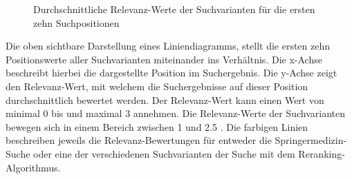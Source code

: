 
\begin{figure}[H]
\centering 
\vspace{-1em}
\caption[Durchschnittliche Relevanz-Werte der Suchvarianten für die ersten zehn Suchpositionen]{Durchschnittliche Relevanz-Werte der Suchvarianten für die ersten zehn Suchpositionen}
\label{fig:Evaluation:Auswertung:RelevanzVarianten}

\footnotesize
{}\rel
  

\vspace{-2em}
\end{figure}

Die oben sichtbare Darstellung eines Liniendiagramms, stellt die ersten zehn Positionswerte aller Suchvarianten miteinander ins Verhältnis. Die x-Achse beschreibt hierbei die dargestellte Position im Suchergebnis. Die y-Achse zeigt den Relevanz-Wert, mit welchem die Suchergebnisse auf dieser Position durchschnittlich bewertet werden. Der Relevanz-Wert kann einen Wert von minimal 0 bis und maximal 3 annehmen. Die Relevanz-Werte der Suchvarianten bewegen sich in einem Bereich zwischen 1 und 2.5 . Die farbigen Linien beschreiben jeweils die Relevanz-Bewertungen für entweder die Springermedizin-Suche oder eine der verschiedenen Suchvarianten der Suche mit dem Reranking-Algorithmus. 

